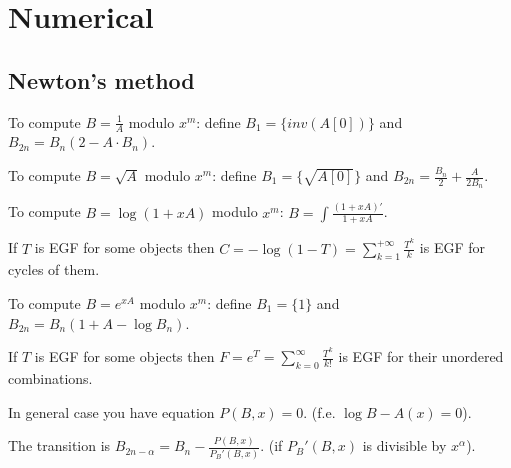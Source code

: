 \chapter{Numerical}
\section{Newton's method}
	To compute $B = \frac{1}{A}$ modulo $x^m$: define $B_1 = \{inv(A[0])\}$ and $B_{2n} = B_n (2 - A \cdot B_n)$.


	To compute $B = \sqrt{A}$ modulo $x^m$: define $B_1 = \{\sqrt{A[0]}\}$ and $B_{2n} = \frac{B_n}{2} + \frac{A}{2B_n}$.


	To compute $B = \log (1 + xA)$ modulo $x^m$: $B = \int\frac{(1 + xA)'}{1 + xA}$.

	If $T$ is EGF for some objects then $C = -\log (1 - T) = \sum_{k = 1}^{+\infty} \frac{T^k}{k}$ is EGF for cycles of them.


	To compute $B = e^{xA}$ modulo $x^m$: define $B_1 = \{1\}$ and $B_{2n} = B_n(1 + A - \log B_n)$.

	If $T$ is EGF for some objects then $F = e^T = \sum_{k = 0}^{\infty} \frac{T^k}{k!}$ is EGF for their unordered combinations.

	In general case you have equation $P(B, x) = 0$. (f.e. $\log B - A(x) = 0$).

	The transition is $B_{2n - \alpha} = B_n - \frac{P(B, x)}{P_B'(B, x)}$. (if $P_B'(B, x)$ is divisible by $x^\alpha$).



